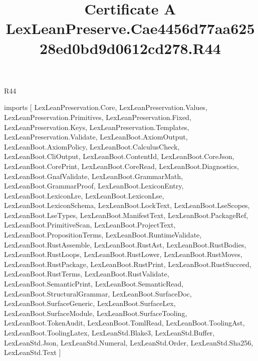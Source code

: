 \begin{lexlean}{R44}
\title{Certificate A LexLeanPreserve.Cae4456d77aa62528ed0bd9d0612cd278.R44}
\begin{coremodule}
imports [
  LexLeanPreservation.Core,
  LexLeanPreservation.Values,
  LexLeanPreservation.Primitives,
  LexLeanPreservation.Fixed,
  LexLeanPreservation.Keys,
  LexLeanPreservation.Templates,
  LexLeanPreservation.Validate,
  LexLeanBoot.AxiomOutput,
  LexLeanBoot.AxiomPolicy,
  LexLeanBoot.CalculusCheck,
  LexLeanBoot.CliOutput,
  LexLeanBoot.ContentId,
  LexLeanBoot.CoreJson,
  LexLeanBoot.CorePrint,
  LexLeanBoot.CoreRead,
  LexLeanBoot.Diagnostics,
  LexLeanBoot.GnafValidate,
  LexLeanBoot.GrammarMath,
  LexLeanBoot.GrammarProof,
  LexLeanBoot.LexiconEntry,
  LexLeanBoot.LexiconLre,
  LexLeanBoot.LexiconLse,
  LexLeanBoot.LexiconSchema,
  LexLeanBoot.LockText,
  LexLeanBoot.LseScopes,
  LexLeanBoot.LseTypes,
  LexLeanBoot.ManifestText,
  LexLeanBoot.PackageRef,
  LexLeanBoot.PrimitiveScan,
  LexLeanBoot.ProjectText,
  LexLeanBoot.PropositionTerms,
  LexLeanBoot.RuntimeValidate,
  LexLeanBoot.RustAssemble,
  LexLeanBoot.RustAst,
  LexLeanBoot.RustBodies,
  LexLeanBoot.RustLoops,
  LexLeanBoot.RustLower,
  LexLeanBoot.RustMoves,
  LexLeanBoot.RustPackage,
  LexLeanBoot.RustPrint,
  LexLeanBoot.RustSucceed,
  LexLeanBoot.RustTerms,
  LexLeanBoot.RustValidate,
  LexLeanBoot.SemanticPrint,
  LexLeanBoot.SemanticRead,
  LexLeanBoot.StructuralGrammar,
  LexLeanBoot.SurfaceDoc,
  LexLeanBoot.SurfaceGeneric,
  LexLeanBoot.SurfaceLex,
  LexLeanBoot.SurfaceModule,
  LexLeanBoot.SurfaceTooling,
  LexLeanBoot.TokenAudit,
  LexLeanBoot.TomlRead,
  LexLeanBoot.ToolingAst,
  LexLeanBoot.ToolingLatex,
  LexLeanStd.Blake3,
  LexLeanStd.Buffer,
  LexLeanStd.Json,
  LexLeanStd.Numeral,
  LexLeanStd.Order,
  LexLeanStd.Sha256,
  LexLeanStd.Text
]


\end{coremodule}
\end{lexlean}
